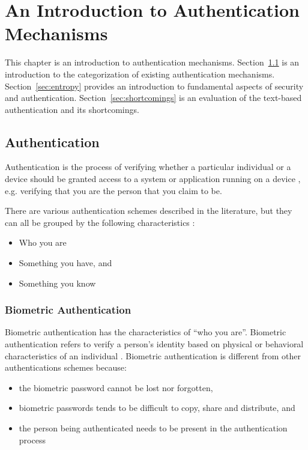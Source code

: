   \chapter{An Introduction to Authentication Mechanisms}
  
    This chapter is an introduction to authentication mechanisms. Section~\ref{sec:authentication} is an introduction to the categorization of existing authentication mechanisms. Section~\ref{sec:entropy} provides an introduction to fundamental aspects of security and authentication. Section~\ref{sec:shortcomings} is an evaluation of the text-based authentication and its shortcomings.

  \clearpage

  \section{Authentication} \label{sec:authentication}

  Authentication is the process of verifying whether a particular individual or a device should be granted access to a system or application running on a device \cite{IPAS}, e.g. verifying that you are the person that you claim to be.

  There are various authentication schemes described in the literature, but they can all be grouped by the following characteristics \cite{IPAS}:

    \begin{itemize}
      \item Who you are
      \item Something you have, and
      \item Something you know
    \end{itemize}

    \subsection{Biometric Authentication}
    Biometric authentication has the characteristics of ``who you are''. Biometric authentication refers to verify a person's identity based on physical or behavioral characteristics of an individual \cite{biometrics, biometrics2}. Biometric authentication is different from other authentications schemes because:

      \begin{itemize}
        \item the biometric password cannot be lost nor forgotten,
        \item biometric passwords tends to be difficult to copy, share and distribute, and 
        \item the person being authenticated needs to be present in the authentication process
      \end{itemize} 

